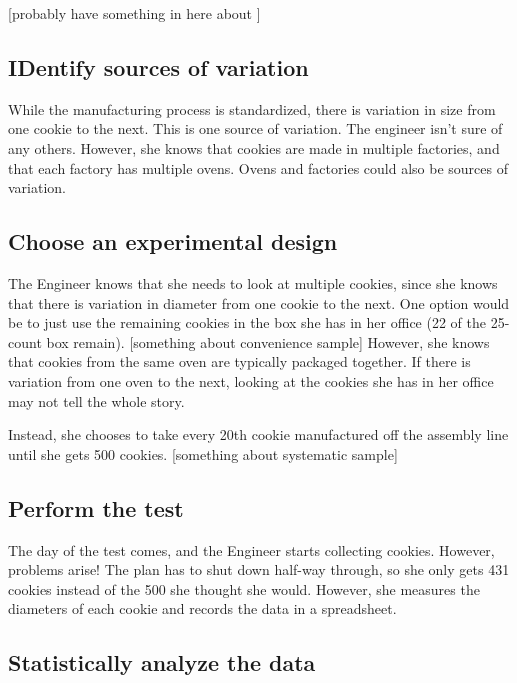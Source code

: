 \documentclass[
]{book}
\theoremstyle{definition}
\theoremstyle{definition}
\theoremstyle{definition}
\theoremstyle{remark}
\begin{document}
{[}probably have something in here about {]}

\hypertarget{identify-sources-of-variation}{%
\subsection{IDentify sources of variation}\label{identify-sources-of-variation}}

While the manufacturing process is standardized, there is variation in size from one cookie to the next. This is one source of variation. The engineer isn't sure of any others. However, she knows that cookies are made in multiple factories, and that each factory has multiple ovens. Ovens and factories could also be sources of variation.

\hypertarget{choose-an-experimental-design}{%
\subsection{Choose an experimental design}\label{choose-an-experimental-design}}

The Engineer knows that she needs to look at multiple cookies, since she knows that there is variation in diameter from one cookie to the next. One option would be to just use the remaining cookies in the box she has in her office (22 of the 25-count box remain). {[}something about convenience sample{]} However, she knows that cookies from the same oven are typically packaged together. If there is variation from one oven to the next, looking at the cookies she has in her office may not tell the whole story.

Instead, she chooses to take every 20th cookie manufactured off the assembly line until she gets 500 cookies. {[}something about systematic sample{]}

\hypertarget{perform-the-test}{%
\subsection{Perform the test}\label{perform-the-test}}

The day of the test comes, and the Engineer starts collecting cookies. However, problems arise! The plan has to shut down half-way through, so she only gets 431 cookies instead of the 500 she thought she would. However, she measures the diameters of each cookie and records the data in a spreadsheet.

\hypertarget{statistically-analyze-the-data}{%
\subsection{Statistically analyze the data}\label{statistically-analyze-the-data}}
\end{document}

